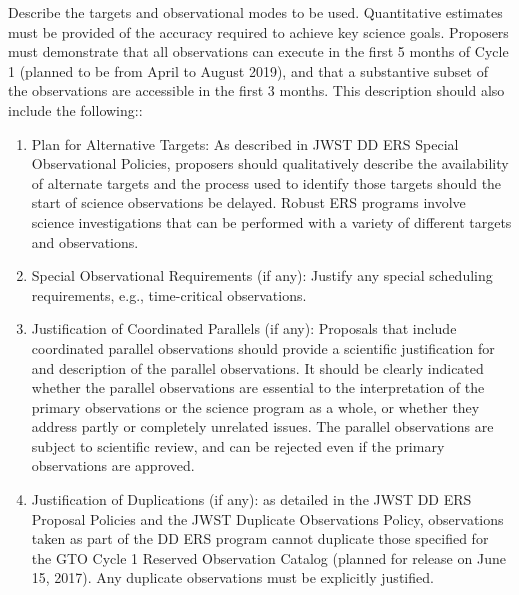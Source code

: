 
Describe the targets and observational modes to be used. Quantitative
estimates must be provided of the accuracy required to achieve key
science goals. Proposers must demonstrate that all observations can
execute in the first 5 months of Cycle 1 (planned to be from April to
August 2019), and that a substantive subset of the observations are
accessible in the first 3 months. This description should also include
the following::

\begin{enumerate}[label=\alph*]
    \item{Plan for Alternative Targets: As described in JWST DD ERS
        Special Observational Policies, proposers should qualitatively
        describe the availability of alternate targets and the process used to
        identify those targets should the start of science observations be
        delayed.  Robust ERS programs involve science investigations that can
        be performed with a variety of different targets and observations. }
      
    \item{Special Observational Requirements (if any): Justify any
        special scheduling requirements, e.g., time-critical observations.}

    \item{Justification of Coordinated Parallels (if any): Proposals
        that include coordinated parallel observations should provide a
        scientific justification for and description of the parallel
        observations. It should be clearly indicated whether the parallel
        observations are essential to the interpretation of the primary
        observations or the science program as a whole, or whether they
        address partly or completely unrelated issues. The parallel
        observations are subject to scientific review, and can be rejected
        even if the primary observations are approved.}

    \item{Justification of Duplications (if any): as detailed in the JWST
        DD ERS Proposal Policies and the JWST Duplicate Observations Policy,
        observations taken as part of the DD ERS program cannot duplicate
        those specified for the GTO Cycle 1 Reserved Observation Catalog
        (planned for release on June 15, 2017). Any duplicate observations
        must be explicitly justified.}
\end{enumerate}



